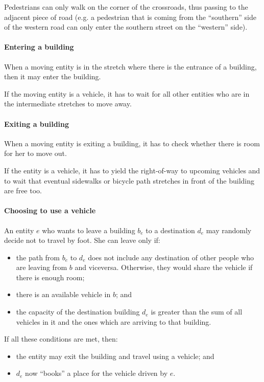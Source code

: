 Pedestrians can only walk on the corner of the crossroads, thus passing to the
adjacent piece of road (e.g. a pedestrian that is coming from the ``southern''
side of the western road can only enter the southern street on the ``western''
side).

\paragraph{Entering a building} When a moving entity is in the stretch where
there is the entrance of a building, then it may enter the building.

If the moving entity is a vehicle, it has to wait for all other entities who
are in the intermediate stretches to move away.

\paragraph{Exiting a building} When a moving entity is exiting a building, it
has to check whether there is room for her to move out.

If the entity is a vehicle, it has to yield the right-of-way to upcoming
vehicles and to wait that eventual sidewalks or bicycle path stretches in front
of the building are free too.

\paragraph{Choosing to use a vehicle} An entity $e$ who wants to leave a
building $b_e$ to a destination $d_e$ may randomly decide not to travel by
foot. She can leave only if:

\begin{itemize}
  \item the path from $b_e$ to $d_e$ does not include any destination of other
    people who are leaving from $b$ and viceversa. Otherwise, they would share
    the vehicle if there is enough room;
  \item there is an available vehicle in $b$; and
  \item the capacity of the destination building $d_e$ is greater than the sum
    of all vehicles in it and the ones which are arriving to that building.
\end{itemize}

If all these conditions are met, then:
\begin{itemize}
  \item the entity may exit the building and travel using a vehicle; and
  \item $d_e$ now ``books'' a place for the vehicle driven by $e$.
\end{itemize}

